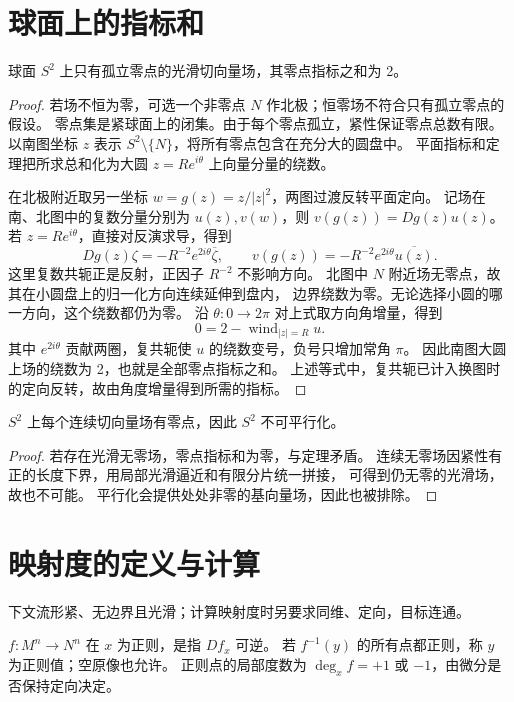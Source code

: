 \section{球面上的指标和}
\begin{theorem}
球面 $S^2$ 上只有孤立零点的光滑切向量场，其零点指标之和为 2。
\end{theorem}
\begin{proof}
若场不恒为零，可选一个非零点 $N$ 作北极；恒零场不符合只有孤立零点的假设。
零点集是紧球面上的闭集。由于每个零点孤立，紧性保证零点总数有限。
以南图坐标 $z$ 表示 $S^2\setminus\{N\}$，将所有零点包含在充分大的圆盘中。
平面指标和定理把所求总和化为大圆 $z=Re^{i\theta}$ 上向量分量的绕数。

在北极附近取另一坐标 $w=g(z)=z/|z|^2$，两图过渡反转平面定向。
记场在南、北图中的复数分量分别为 $u(z),v(w)$，则 $v(g(z))=Dg(z)u(z)$。
若 $z=Re^{i\theta}$，直接对反演求导，得到
\[
 Dg(z)\zeta=-R^{-2}e^{2i\theta}\overline\zeta,
 \qquad
 v(g(z))=-R^{-2}e^{2i\theta}\overline{u(z)}.
\]
这里复数共轭正是反射，正因子 $R^{-2}$ 不影响方向。
北图中 $N$ 附近场无零点，故其在小圆盘上的归一化方向连续延伸到盘内，
边界绕数为零。无论选择小圆的哪一方向，这个绕数都仍为零。
沿 $\theta:0\to2\pi$ 对上式取方向角增量，得到
\[
 0=2-\operatorname{wind}_{|z|=R}u.
\]
其中 $e^{2i\theta}$ 贡献两圈，复共轭使 $u$ 的绕数变号，负号只增加常角 $\pi$。
因此南图大圆上场的绕数为 2，也就是全部零点指标之和。
上述等式中，复共轭已计入换图时的定向反转，故由角度增量得到所需的指标。
\end{proof}
\begin{corollary}[毛球结论]
$S^2$ 上每个连续切向量场有零点，因此 $S^2$ 不可平行化。
\end{corollary}
\begin{proof}
若存在光滑无零场，零点指标和为零，与定理矛盾。
连续无零场因紧性有正的长度下界，用局部光滑逼近和有限分片统一拼接，
可得到仍无零的光滑场，故也不可能。
平行化会提供处处非零的基向量场，因此也被排除。
\end{proof}


\section{映射度的定义与计算}
下文流形紧、无边界且光滑；计算映射度时另要求同维、定向，目标连通。
\begin{definition}
$f:M^n\to N^n$ 在 $x$ 为正则，是指 $D f_x$ 可逆。
若 $f^{-1}(y)$ 的所有点都正则，称 $y$ 为正则值；空原像也允许。
正则点的局部度数为 $\deg_x f=+1$ 或 $-1$，由微分是否保持定向决定。
\end{definition}

